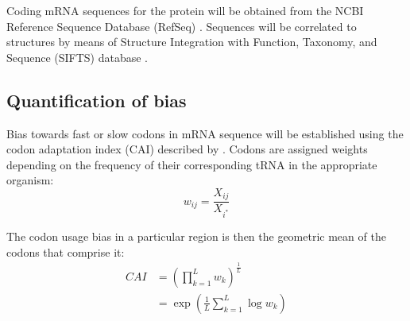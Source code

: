 \documentclass[11pt]{nih}
\begin{document}
Coding mRNA sequences for the protein will be obtained from the NCBI Reference Sequence Database (RefSeq) \citep{refseq}. Sequences will be correlated to structures by means of Structure Integration with Function, Taxonomy, and Sequence (SIFTS) database \citep{sifts}.

\subsection{Quantification of bias}
Bias towards fast or slow codons in mRNA sequence will be established using the codon adaptation index (CAI) described by \citet{sharp1987codon}. Codons are assigned weights depending on the frequency of their corresponding tRNA in the appropriate organism:
\begin{equation}
w_{ij} = \frac{X_{ij}}{X_{i^*}}
\end{equation}

The codon usage bias in a particular region is then the geometric mean of the codons that comprise it:
\begin{align}
CAI &= (\displaystyle \prod_{k=1}^L w_k )^{\frac{1}{L}} \\
&= \exp(\frac{1}{L} \displaystyle \sum_{k=1}^L \log w_k)
\end{align}
\end{document}
